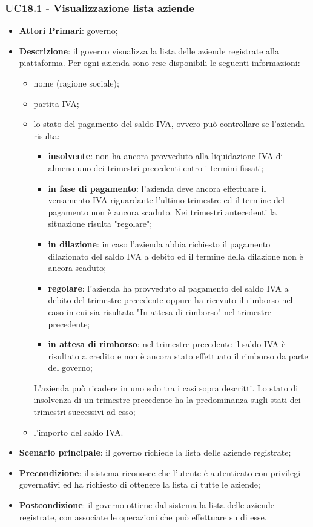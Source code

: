 \subsubsection{UC18.1 - Visualizzazione lista aziende}

 \begin{itemize}
	\item \textbf{Attori Primari}: governo;
	\item \textbf{Descrizione}: il governo visualizza la lista delle aziende registrate alla piattaforma. Per ogni azienda sono rese disponibili le seguenti informazioni:
	\begin{itemize}
		\item nome (ragione sociale);
		\item partita IVA;
		\item lo stato del pagamento del saldo IVA, ovvero può controllare se l'azienda risulta:
		\begin{itemize}
			\item \textbf{insolvente}: non ha ancora provveduto alla liquidazione IVA di almeno uno dei trimestri precedenti entro i termini fissati;
			\item \textbf{in fase di pagamento}: l'azienda deve ancora effettuare il versamento IVA riguardante l'ultimo trimestre ed il termine del pagamento non è ancora scaduto. Nei trimestri antecedenti la situazione risulta "regolare";
			\item \textbf{in dilazione}: in caso l'azienda abbia richiesto il pagamento dilazionato del saldo IVA a debito ed il termine della dilazione non è ancora scaduto;
			\item \textbf{regolare}: l'azienda ha provveduto al pagamento del saldo IVA a debito del trimestre precedente oppure ha ricevuto il rimborso nel caso in cui sia risultata "In attesa di rimborso" nel trimestre precedente;
			\item \textbf{in attesa di rimborso}: nel trimestre precedente il saldo IVA è risultato a credito e non è ancora stato effettuato il rimborso da parte del governo;
		\end{itemize}
	L'azienda può ricadere in uno solo tra i casi sopra descritti. Lo stato di insolvenza di un trimestre precedente ha la predominanza sugli stati dei trimestri successivi ad esso;
		\item l'importo del saldo IVA.
	\end{itemize}
	
	\item \textbf{Scenario principale}: il governo richiede la lista delle aziende registrate;
	\item \textbf{Precondizione}: il sistema riconosce che l'utente è autenticato con privilegi governativi ed ha richiesto di ottenere la lista di tutte le aziende;
	\item \textbf{Postcondizione}: il governo ottiene dal sistema la lista delle aziende registrate, con associate le operazioni che può effettuare su di esse.
\end{itemize}
